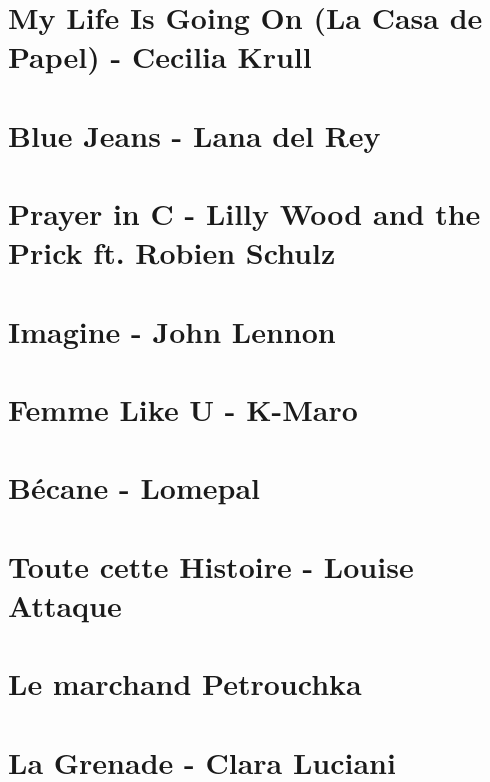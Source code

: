 \documentclass[11pt]{article}
\begin{document}
\section{My Life Is Going On (La Casa de Papel) - Cecilia Krull }
\begin{guitar}

\end{guitar}

\section{Blue Jeans - Lana del Rey}


\section{Prayer in C - Lilly Wood and the Prick ft. Robien Schulz}



\section{Imagine - John Lennon}


\section{Femme Like U - K-Maro}


\section{Bécane - Lomepal}


\section{Toute cette Histoire - Louise Attaque}


\section{Le marchand Petrouchka}
\begin{guitar}

\end{guitar}

\section{La Grenade - Clara Luciani}
\begin{guitar}

\end{guitar}
\end{document}
